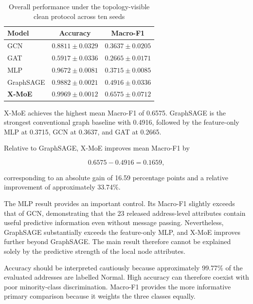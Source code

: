 \documentclass{ieeeaccess}
\begin{document}
\begin{table}[t]
\centering
\caption{Overall performance under the topology-visible clean protocol across ten seeds}
\label{tab:clean_overall_results}

\renewcommand{\arraystretch}{1.12}
\setlength{\tabcolsep}{4pt}
\scriptsize

\begin{tabular}{lcc}
\toprule
\textbf{Model} &
\textbf{Accuracy} &
\textbf{Macro-F1} \\
\midrule

GCN &
$0.8811 \pm 0.0329$ &
$0.3637 \pm 0.0205$ \\

GAT &
$0.5917 \pm 0.0336$ &
$0.2665 \pm 0.0171$ \\

MLP &
$0.9672 \pm 0.0081$ &
$0.3715 \pm 0.0085$ \\

GraphSAGE &
$0.9882 \pm 0.0021$ &
$0.4916 \pm 0.0336$ \\

\textbf{X-MoE} &
$\mathbf{0.9969 \pm 0.0012}$ &
$\mathbf{0.6575 \pm 0.0712}$ \\

\bottomrule
\end{tabular}
\end{table}

X-MoE achieves the highest mean Macro-F1 of 0.6575. GraphSAGE is the strongest conventional graph baseline with 0.4916, followed by the feature-only MLP at 0.3715, GCN at 0.3637, and GAT at 0.2665.

Relative to GraphSAGE, X-MoE improves mean Macro-F1 by

\begin{equation}
0.6575-0.4916=0.1659,
\end{equation}

corresponding to an absolute gain of 16.59 percentage points and a relative improvement of approximately 33.74\%.

The MLP result provides an important control. Its Macro-F1 slightly exceeds that of GCN, demonstrating that the 23 released address-level attributes contain useful predictive information even without message passing. Nevertheless, GraphSAGE substantially exceeds the feature-only MLP, and X-MoE improves further beyond GraphSAGE. The main result therefore cannot be explained solely by the predictive strength of the local node attributes.

Accuracy should be interpreted cautiously because approximately 99.77\% of the evaluated addresses are labelled Normal. High accuracy can therefore coexist with poor minority-class discrimination. Macro-F1 provides the more informative primary comparison because it weights the three classes equally.
\end{document}
